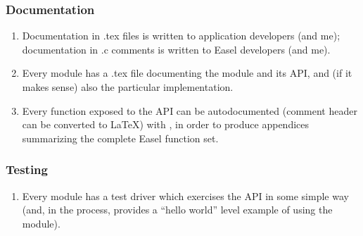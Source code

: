 \subsubsection{Documentation}

\begin{enumerate}
\item Documentation in .tex files is written to application developers
      (and me); documentation in .c comments is written to Easel
      developers (and me).

\item Every module has a .tex file documenting the module and its API,
      and (if it makes sense) also the particular implementation.

\item Every function exposed to the API can be autodocumented (comment
      header can be converted to \LaTeX) with
      , in order to produce appendices
      summarizing the complete Easel function set.
\end{enumerate}


\subsubsection{Testing}

\begin{enumerate}

\item Every module has a test driver which exercises the API in some
      simple way (and, in the process, provides a ``hello world''
      level example of using the module).

\end{enumerate}










